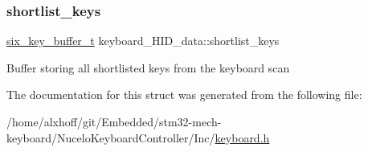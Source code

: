 \subsubsection{\texorpdfstring{shortlist\+\_\+keys}{shortlist\_keys}}
{\footnotesize\ttfamily \hyperlink{keyboard_8h_ade7751d5843483b986b63a84a5ea6963}{six\+\_\+key\+\_\+buffer\+\_\+t} keyboard\+\_\+\+H\+I\+D\+\_\+data\+::shortlist\+\_\+keys}

Buffer storing all shortlisted keys from the keyboard scan 

The documentation for this struct was generated from the following file\+:\begin{DoxyCompactItemize}
\item 
/home/alxhoff/git/\+Embedded/stm32-\/mech-\/keyboard/\+Nucelo\+Keyboard\+Controller/\+Inc/\hyperlink{keyboard_8h}{keyboard.\+h}\end{DoxyCompactItemize}
